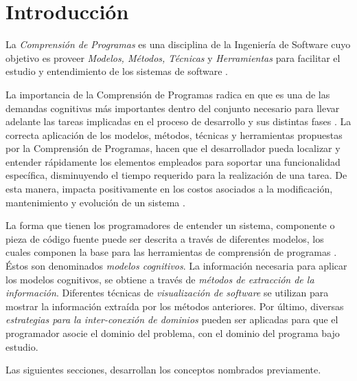 \section{Introducción}

La \textit{Comprensión de Programas} es una disciplina de la Ingeniería de Software
cuyo objetivo es proveer \textit{Modelos, Métodos, Técnicas} y \textit{Herramientas}
para facilitar el estudio y entendimiento de los sistemas de software \cite{BeronHenriquesPereira10}.

La importancia de la Comprensión de Programas radica en que es una de las demandas cognitivas
más importantes dentro del conjunto necesario para llevar adelante las tareas implicadas
en el proceso de desarrollo y sus distintas fases \cite{PetreDeQuincey06}.
La correcta aplicación de los modelos, métodos, técnicas y herramientas propuestas por
la Comprensión de Programas, hacen que el desarrollador pueda localizar y entender rápidamente
los elementos empleados para soportar una funcionalidad específica, disminuyendo el tiempo requerido
para la realización de una tarea.
De esta manera, impacta positivamente en los costos asociados a la
modificación, mantenimiento y evolución de un sistema \cite{BeronHenriquesPereira10}.

La forma que tienen los programadores de entender un sistema, componente o pieza de código fuente
puede ser descrita a través de diferentes modelos, los cuales componen la base para las herramientas
de comprensión de programas \cite{BeronHenriquesPereiraUzal07}.
Éstos son denominados \textit{modelos cognitivos}.
La información necesaria para aplicar los modelos cognitivos, se obtiene a través de
\textit{métodos de extracción de la información}.
Diferentes técnicas de \textit{visualización de software} se utilizan para mostrar la
información extraída por los métodos anteriores.
Por último, diversas \textit{estrategias para la inter-conexión de dominios} pueden ser
aplicadas para que el programador asocie el dominio del problema, con el dominio
del programa bajo estudio.

Las siguientes secciones, desarrollan los conceptos nombrados previamente.
